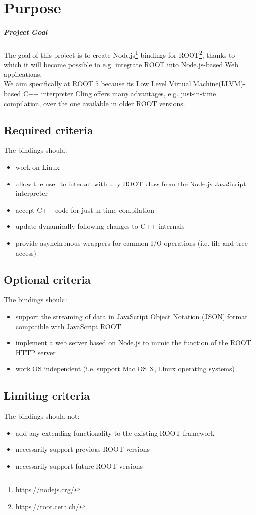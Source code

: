 \chapter{Purpose}
\paragraph{Project Goal}
\noindent The goal of this project is to create Node.js\textsuperscript{\textregistered}\footnote{\url{https://nodejs.org/}} bindings for
ROOT\footnote{\url{https://root.cern.ch/}}, thanks to which it will become possible to e.g. integrate ROOT into Node.js-based Web applications.\\
We aim specifically at ROOT 6 because its Low Level Virtual Machine(LLVM)-based C++ interpreter Cling offers many advantages, e.g. just-in-time compilation, over the one available in older ROOT versions.
\section{Required criteria}
The bindings should:
\begin{itemize}
	\item work on Linux
	\item allow the user to interact with any ROOT class from the Node.js JavaScript interpreter
	\item accept C++ code for just-in-time compilation
	\item update dynamically following changes to C++ internals
	\item provide asynchronous wrappers for common I/O operations (i.e. file and tree access)
\end{itemize}

\section{Optional criteria}
The bindings should:
\begin{itemize}
	\item support the streaming of data in JavaScript Object Notation (JSON) format compatible with JavaScript ROOT
	\item implement a web server based on Node.js to mimic the function of the ROOT HTTP server
	\item work OS independent (i.e. support Mac OS X, Linux operating systems)
\end{itemize}

\section{Limiting criteria}
The bindings should not:
\begin{itemize}
	\item add any extending functionality to the existing ROOT framework
	\item necessarily support previous ROOT versions
	\item necessarily support future ROOT versions
\end{itemize}
